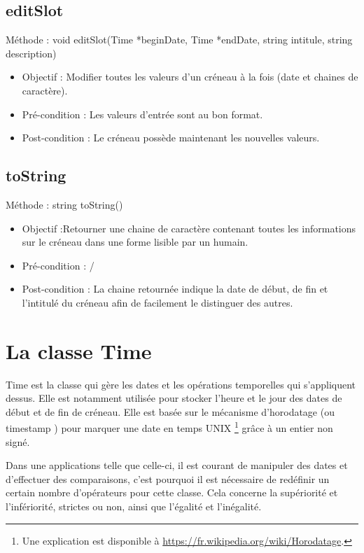    		\subsection*{editSlot}
            Méthode : void editSlot(Time *beginDate, Time *endDate, string intitule, string description)
			\begin{itemize}
				\item Objectif  : Modifier toutes les valeurs d'un créneau à la fois (date et chaines de caractère).
				\item Pré-condition : Les valeurs d'entrée sont au bon format.
				\item Post-condition : Le créneau possède maintenant les nouvelles valeurs.
			\end{itemize}
			
   		\subsection*{toString}
            Méthode : string toString()
			\begin{itemize}
				\item Objectif  :Retourner une chaine de caractère contenant toutes les informations sur le créneau dans une forme lisible par un humain.
				\item Pré-condition : /
				\item Post-condition : La chaine retournée indique la date de début, de fin et l'intitulé du créneau afin de facilement le distinguer des autres.
			\end{itemize}

	\section{La classe Time}
        Time est la classe qui gère les dates et les opérations temporelles qui s'appliquent dessus. Elle est notamment utilisée pour stocker l'heure et le jour des dates de début et de fin de créneau. Elle est basée sur le mécanisme d'horodatage (ou \og timestamp \fg{}) pour marquer une date en temps UNIX \footnote{Une explication est disponible à \hyperref[cette adresse]{https://fr.wikipedia.org/wiki/Horodatage}.} grâce à un entier non signé.
        
        Dans une applications telle que celle-ci, il est courant de manipuler des dates et d'effectuer des comparaisons, c'est pourquoi il est nécessaire de redéfinir un certain nombre d'opérateurs pour cette classe. Cela concerne la supériorité et l'infériorité, strictes ou non, ainsi que l'égalité et l'inégalité.
        

